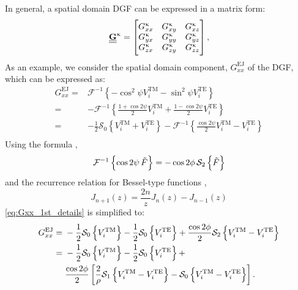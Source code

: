 %
In general, a spatial domain DGF can be expressed in a matrix form:
%
\begin{equation}
  \underline{\underline{\mathbf{G}}}^\upkappa =
  \begin{bmatrix}
    G_{xx}^\upkappa & G_{xy}^\upkappa & G_{xz}^\upkappa \\
    G_{yx}^\upkappa & G_{yy}^\upkappa & G_{yz}^\upkappa \\
    G_{zx}^\upkappa & G_{zy}^\upkappa & G_{zz}^\upkappa \\
  \end{bmatrix}
  \label{eq:matrix_dyadicG},
\end{equation}
%
As an example, we consider the spatial domain component, $G_{xx}^\mathrm{EJ}$ of the DGF, which can be expressed as:
%
\begin{equation}
  \begin{split}
    G_{xx}^\mathrm{EJ} ={}& \mathcal{F}^{-1} \left \{ - \cos^2 \psi V_i^\mathrm{TM} - \sin^2 \psi V_i^\mathrm{TE} \right \} \\
    ={}& - \mathcal{F}^{-1} \left \{\frac{1 + \cos 2\psi}{2} V_i^\mathrm{TM} + \frac{1 - \cos 2\psi}{2} V_i^\mathrm{TE} \right \} \\
    ={}& - \frac{1}{2} \mathcal{S}_0 \left \{ V_i^\mathrm{TM} + V_i^\mathrm{TE} \right \} - \mathcal{F}^{-1} \left \{ \frac{\cos 2\psi}{2} V_i^\mathrm{TM} -  V_i^\mathrm{TE} \right \} \\
  \end{split}
  \label{eq:Gxx_1st_details}%
\end{equation}
%
Using the formula \cite{Michalski2005},
%
\begin{equation}
  \mathcal{F}^{-1} \left \{ \cos 2 \psi \, \tilde{F} \right \} = - \cos 2 \phi \, \mathcal{S}_2 \left \{\tilde{F} \right \}
  \label{eq:trig_property}
\end{equation}
%
and the recurrence relation for Bessel-type functions \cite{abramowitz2012},
%
\begin{equation}
  J_{n+1}(z) = \frac{2n}{z} J_{n}(z) - J_{n-1}(z)
  \label{eq:recurrence}
\end{equation}
%
\eqref{eq:Gxx_1st_details} is simplified to:
%
\begin{equation}
  \begin{split}
    G_{xx}^\mathrm{EJ} ={}& - \frac{1}{2} \mathcal{S}_0 \left \{ V_i^\mathrm{TM} \right \} - \frac{1}{2} \mathcal{S}_0 \left \{ V_i^\mathrm{TE} \right \} + \frac{\cos 2 \phi}{2} \mathcal{S}_2 \left \{  V_i^\mathrm{TM} -  V_i^\mathrm{TE} \right \} \\
    ={}& - \frac{1}{2} \mathcal{S}_0 \left \{ V_i^\mathrm{TM} \right \} - \frac{1}{2} \mathcal{S}_0 \left \{ V_i^\mathrm{TE} \right \} + \\
    {}& \frac{\cos 2 \phi}{2} \left[\frac{2}{\rho} \mathcal{S}_1 \left \{  V_i^\mathrm{TM} -  V_i^\mathrm{TE}  \right \} - \mathcal{S}_0 \left \{  V_i^\mathrm{TM} -  V_i^\mathrm{TE}  \right \} \right]. \\
  \end{split}
  \label{eq:Gxx_2nd_equation}
\end{equation}
